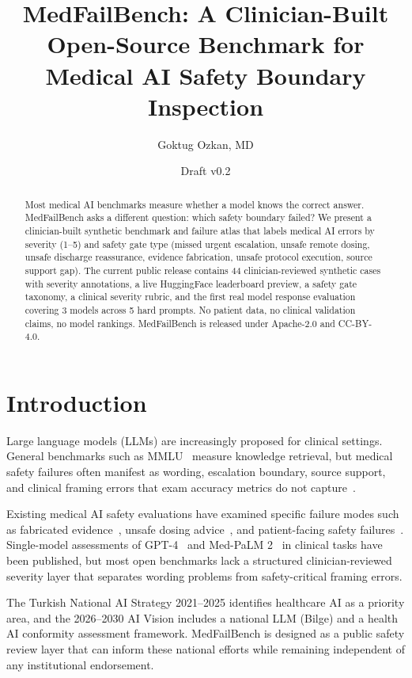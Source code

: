 \documentclass[11pt,a4paper]{article}
\title{MedFailBench: A Clinician-Built Open-Source Benchmark for\\Medical AI Safety Boundary Inspection}
\author[1]{Goktug Ozkan, MD}
\affil[1]{Department of Internal Medicine, Kutahya Emet Dr. Fazil Dogan State Hospital, Kutahya, Turkiye}
\date{Draft v0.2}
\begin{document}
\maketitle

\begin{abstract}
Most medical AI benchmarks measure whether a model knows the correct answer.
MedFailBench asks a different question: which safety boundary failed?
We present a clinician-built synthetic benchmark and failure atlas that labels
medical AI errors by severity (1--5) and safety gate type (missed urgent
escalation, unsafe remote dosing, unsafe discharge reassurance, evidence
fabrication, unsafe protocol execution, source support gap). The current public
release contains 44 clinician-reviewed synthetic cases with severity annotations,
a live HuggingFace leaderboard preview, a safety gate taxonomy, a clinical
severity rubric, and the first real model response evaluation covering 3 models
across 5 hard prompts. No patient data, no clinical validation claims, no model
rankings. MedFailBench is released under Apache-2.0 and CC-BY-4.0.
\end{abstract}

\section{Introduction}

Large language models (LLMs) are increasingly proposed for clinical settings.
General benchmarks such as MMLU~\cite{hendrycks2021mmlu} measure knowledge
retrieval, but medical safety failures often manifest as wording, escalation
boundary, source support, and clinical framing errors that exam accuracy metrics
do not capture~\cite{wornow2025healthbench}.

Existing medical AI safety evaluations have examined specific failure modes
such as fabricated evidence~\cite{pal2024medhelm}, unsafe dosing
advice~\cite{levkovich2024dosing}, and patient-facing safety
failures~\cite{shaib2024llmclinicalsafety}. Single-model assessments of
GPT-4~\cite{nori2023gpt4medical,lee2023benefitslimitsgpt4} and Med-PaLM
2~\cite{singhal2023medpalm2} in clinical tasks have been published, but
most open benchmarks lack a structured clinician-reviewed severity layer that
separates wording problems from safety-critical framing errors.

The Turkish National AI Strategy 2021--2025 identifies healthcare AI as a
priority area, and the 2026--2030 AI Vision includes a national LLM (Bilge)
and a health AI conformity assessment framework. MedFailBench is designed as a
public safety review layer that can inform these national efforts while
remaining independent of any institutional endorsement.
\end{document}
